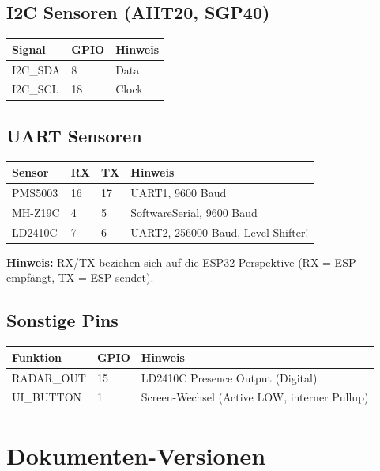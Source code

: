 \documentclass[a4paper,11pt]{article}
\begin{document}
\subsection{I2C Sensoren (AHT20, SGP40)}

\begin{longtable}{p{3cm} p{2.5cm} p{7.5cm}}
\toprule
\rowcolor{tableheader}
\textbf{Signal} & \textbf{GPIO} & \textbf{Hinweis} \\
\midrule
\endhead
I2C\_SDA & 8  & Data \\
I2C\_SCL & 18 & Clock \\
\bottomrule
\end{longtable}

\subsection{UART Sensoren}

\begin{longtable}{p{3cm} p{2cm} p{2cm} p{5.5cm}}
\toprule
\rowcolor{tableheader}
\textbf{Sensor} & \textbf{RX} & \textbf{TX} & \textbf{Hinweis} \\
\midrule
\endhead
PMS5003  & 16 & 17 & UART1, 9600 Baud \\
MH-Z19C  & 4  & 5  & SoftwareSerial, 9600 Baud \\
LD2410C  & 7  & 6  & UART2, 256000 Baud, Level Shifter! \\
\bottomrule
\end{longtable}

\textbf{Hinweis:} RX/TX beziehen sich auf die ESP32-Perspektive (RX = ESP empfängt, TX = ESP sendet).

\subsection{Sonstige Pins}

\begin{longtable}{p{3.5cm} p{2.5cm} p{7cm}}
\toprule
\rowcolor{tableheader}
\textbf{Funktion} & \textbf{GPIO} & \textbf{Hinweis} \\
\midrule
\endhead
RADAR\_OUT & 15 & LD2410C Presence Output (Digital) \\
UI\_BUTTON & 1  & Screen-Wechsel (Active LOW, interner Pullup) \\
\bottomrule
\end{longtable}

\section{Dokumenten-Versionen}
\end{document}
